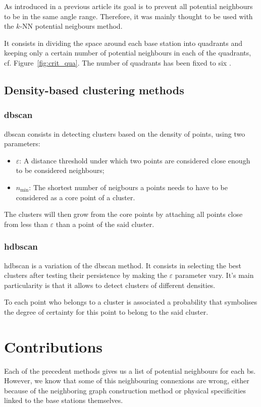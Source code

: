 \documentclass[lettersize,journal,english]{IEEEtran}
\begin{document}
As introduced in a previous article \cite{10201211} its goal is to prevent all potential neighbours to be in the same angle range. Therefore, it was mainly thought to be used with the 
$k$-NN potential neigbours method.

It consists in dividing the space around each base station into quadrants and keeping only a certain number of potential neighbours
in each of the quadrants, cf. Figure~\ref{fig:crit_qua}.
The number of quadrants has been fixed to six \cite{art_del_paq}.

\subsection{Density-based clustering methods}
\subsubsection{\acrshort{dbscan}}
\acrshort{dbscan} consists in detecting clusters based on the density of points, using two parameters:
\begin{itemize}
    \item \emph{$\varepsilon$}: A distance threshold under which two points are considered close enough to be considered neighbours;   
    \item \emph{$n_{\text{min}}$}: The shortest number of neigbours a points needs to have to be considered as a core point of a cluster.
\end{itemize}

The clusters will then \og grow\fg{} from the core points by attaching all points close from less than \emph{$\varepsilon$} than a point of the said 
cluster.

\subsubsection{\acrshort{hdbscan}}
\acrshort{hdbscan} \cite{10.1007/978-3-642-37456-2_14} is a variation of the \acrshort{dbscan} method. It consists
in selecting the best clusters after testing their persistence by making the $\varepsilon$ parameter vary. It's main particularity
is that it allows to detect clusters of different densities.

To each point who belongs to a cluster is associated a probability that symbolises the degree of certainty for this point to belong
to the said cluster.

\section{Contributions}
\noindent Each of the precedent methods gives us a list of potential neighbours for each \acrshort{bs}.
However, we know that some of this neighbouring connexions are wrong,
either because of the neighboring graph construction method or physical specificities linked to the base stations themselves.
\end{document}
